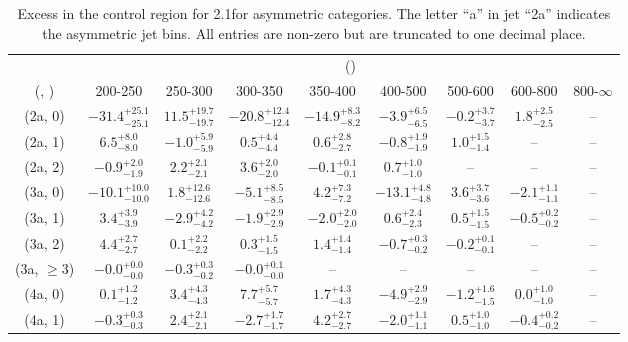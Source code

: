 \begin{table}[h!]
\tiny
\centering
\caption{Excess in the \mmj control region for 2.1\ifb for asymmetric categories. The letter ``a'' in jet \eg ``2a''  indicates the asymmetric jet bins. All entries are non-zero but are truncated to one decimal place.\label{tab:excesssepnaive_mumu_ewk_asym}}
\begin{tabular}
{ccccccccc}
	\hline\hline
	& \multicolumn{8}{c}{\scalht (\gev)} \\ 
	 (\njet,  \nb) & 200-250 & 250-300 & 300-350 & 350-400 & 400-500 & 500-600 & 600-800 & 800-$\infty$ \\ [0.8ex] 
\hline
	(2a, 0) & $-31.4^{+ 25.1 }_{- 25.1 }$ & $11.5^{+ 19.7 }_{- 19.7 }$ & $-20.8^{+ 12.4 }_{- 12.4 }$ & $-14.9^{+ 8.3 }_{- 8.2 }$ & $-3.9^{+ 6.5 }_{- 6.5 }$ & $-0.2^{+ 3.7 }_{- 3.7 }$ & $1.8^{+ 2.5 }_{- 2.5 }$ & -- \\[0.5ex] 
	(2a, 1) & $6.5^{+ 8.0 }_{- 8.0 }$ & $-1.0^{+ 5.9 }_{- 5.9 }$ & $0.5^{+ 4.4 }_{- 4.4 }$ & $0.6^{+ 2.8 }_{- 2.7 }$ & $-0.8^{+ 1.9 }_{- 1.9 }$ & $1.0^{+ 1.5 }_{- 1.4 }$ & -- & -- \\[0.5ex] 
	(2a, 2) & $-0.9^{+ 2.0 }_{- 1.9 }$ & $2.2^{+ 2.1 }_{- 2.1 }$ & $3.6^{+ 2.0 }_{- 2.0 }$ & $-0.1^{+ 0.1 }_{- 0.1 }$ & $0.7^{+ 1.0 }_{- 1.0 }$ & -- & -- & -- \\[0.5ex] 
	(3a, 0) & $-10.1^{+ 10.0 }_{- 10.0 }$ & $1.8^{+ 12.6 }_{- 12.6 }$ & $-5.1^{+ 8.5 }_{- 8.5 }$ & $4.2^{+ 7.3 }_{- 7.2 }$ & $-13.1^{+ 4.8 }_{- 4.8 }$ & $3.6^{+ 3.7 }_{- 3.6 }$ & $-2.1^{+ 1.1 }_{- 1.1 }$ & -- \\[0.5ex] 
	(3a, 1) & $3.4^{+ 3.9 }_{- 3.9 }$ & $-2.9^{+ 4.2 }_{- 4.2 }$ & $-1.9^{+ 2.9 }_{- 2.9 }$ & $-2.0^{+ 2.0 }_{- 2.0 }$ & $0.6^{+ 2.4 }_{- 2.3 }$ & $0.5^{+ 1.5 }_{- 1.5 }$ & $-0.5^{+ 0.2 }_{- 0.2 }$ & -- \\[0.5ex] 
	(3a, 2) & $4.4^{+ 2.7 }_{- 2.7 }$ & $0.1^{+ 2.2 }_{- 2.2 }$ & $0.3^{+ 1.5 }_{- 1.5 }$ & $1.4^{+ 1.4 }_{- 1.4 }$ & $-0.7^{+ 0.3 }_{- 0.2 }$ & $-0.2^{+ 0.1 }_{- 0.1 }$ & -- & -- \\[0.5ex] 
	(3a, $\ge3$) & $-0.0^{+ 0.0 }_{- 0.0 }$ & $-0.3^{+ 0.3 }_{- 0.2 }$ & $-0.0^{+ 0.1 }_{- 0.0 }$ & -- & -- & -- & -- & -- \\[0.5ex] 
	(4a, 0) & $0.1^{+ 1.2 }_{- 1.2 }$ & $3.4^{+ 4.3 }_{- 4.3 }$ & $7.7^{+ 5.7 }_{- 5.7 }$ & $1.7^{+ 4.3 }_{- 4.3 }$ & $-4.9^{+ 2.9 }_{- 2.9 }$ & $-1.2^{+ 1.6 }_{- 1.5 }$ & $0.0^{+ 1.0 }_{- 1.0 }$ & -- \\[0.5ex] 
	(4a, 1) & $-0.3^{+ 0.3 }_{- 0.3 }$ & $2.4^{+ 2.1 }_{- 2.1 }$ & $-2.7^{+ 1.7 }_{- 1.7 }$ & $4.2^{+ 2.7 }_{- 2.7 }$ & $-2.0^{+ 1.1 }_{- 1.1 }$ & $0.5^{+ 1.0 }_{- 1.0 }$ & $-0.4^{+ 0.2 }_{- 0.2 }$ & -- \\[0.5ex] 

\end{tabular}
\end{table}
